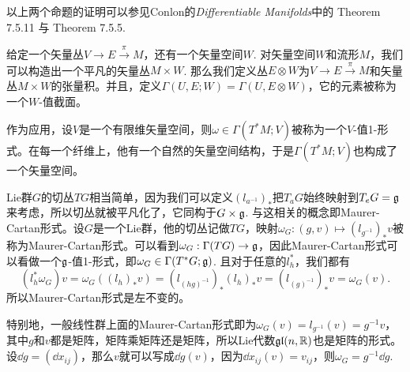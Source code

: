 以上两个命题的证明可以参见Conlon的\textit{Differentiable Manifolds}中的 Theorem 7.5.11 与 Theorem 7.5.5.


\begin{para}[矢量值截面]
给定一个矢量丛$V\to E\xrightarrow{\pi} M$，还有一个矢量空间$W$. 对矢量空间$W$和流形$M$，我们可以构造出一个平凡的矢量丛$M\times W$. 那么我们定义丛$E\otimes W$为$V\to E\xrightarrow{\pi} M$和矢量丛$M\times W$的张量积。并且，定义$\Gamma(U,E;W)=\Gamma(U,E\otimes W)$，它的元素被称为一个$W$-值截面。
\end{para}

作为应用，设$V$是一个有限维矢量空间，则$\omega\in \Gamma(T^*M;V)$被称为一个$V$-值1-形式。在每一个纤维上，他有一个自然的矢量空间结构，于是$\Gamma(T^*M;V)$也构成了一个矢量空间。

\begin{para}[Lie群的切丛]
Lie群$G$的切丛$TG$相当简单，因为我们可以定义$(l_{a^{-1}})_*$把$T_aG$始终映射到$T_eG={\mathfrak{g}}$来考虑，所以切丛就被平凡化了，它同构于$G\times {\mathfrak{g}}$. 与这相关的概念即Maurer-Cartan形式。设$G$是一个Lie群，他的切丛记做$TG$，映射$\omega_G:(g,v)\mapsto (l_{g^{-1}})_*v$被称为Maurer-Cartan形式。可以看到$\omega_G:\Gamma(TG)\to {\mathfrak{g}}$，因此Maurer-Cartan形式可以看做一个${\mathfrak{g}}$-值1-形式，即$\omega_G\in \Gamma(T^*G;{\mathfrak{g}})$. 且对于任意的$l_h^*$，我们都有
\[
	(l_h^*\omega_G)v=\omega_G((l_h)_*v)=(l_{(hg)^{-1}})_*(l_h)_*v=(l_{(g)^{-1}})_*v=\omega_G(v).
\]
所以Maurer-Cartan形式是左不变的。

特别地，一般线性群上面的Maurer-Cartan形式即为$\omega_G(v)=l_{g^{-1}}(v)=g^{-1}v$，其中$g$和$v$都是矩阵，矩阵乘矩阵还是矩阵，所以Lie代数$\mathfrak{gl}(n,\mathbb{R})$也是矩阵的形式。设$\dd g=(\dd x_{ij})$，那么$v$就可以写成$\dd g(v)$，因为$\dd x_{ij}(v)=v_{ij}$，则$\omega_G=g^{-1}\dd g$.
\end{para}

